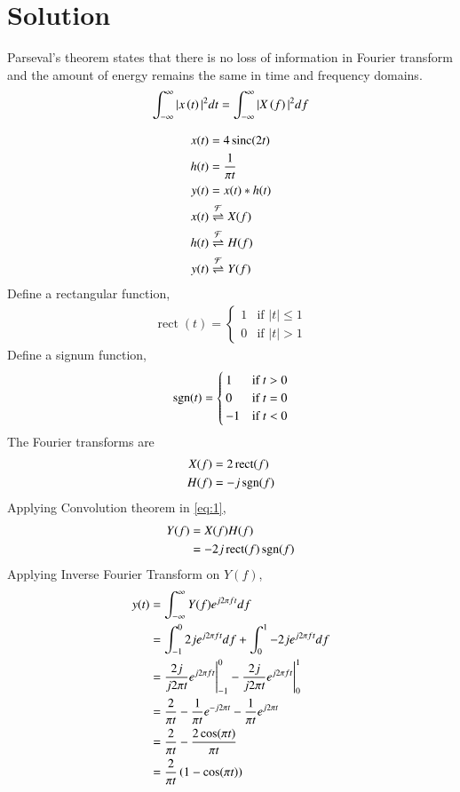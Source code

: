 \documentclass[journal,12pt,twocolumn]{IEEEtran}
\DeclareMathOperator{\sinc}{sinc}
\DeclareMathOperator{\rect}{rect}
\begin{document}
\section*{Solution}
\begin{lemma}
Parseval's theorem states that there is no loss of information in Fourier transform and the amount of energy remains the same in time and frequency domains.
\begin{align}
    \int_{-\infty}^{\infty} |x\left(t\right)|^{2} dt = \int_{-\infty}^{\infty} |X\left(f\right)|^{2} df
\end{align}
\end{lemma}
\begin{align}
    x(t) &= 4\sinc(2t)\\
    h(t) &= \frac{1}{\pi t}\\
    y(t) &= x(t) * h(t) \label{eq:1}\\
    x(t) &\fourier{X(f)}\\
    h(t) &\fourier{H(f)}\\
    y(t) &\fourier{Y(f)}
\end{align}
Define a rectangular function,
\begin{align}
    \rect(t) =
    \begin{cases}
    1 & \text{if } |t| \leq 1\\
    0 & \text{if } |t| > 1
    \end{cases}
\end{align}
Define a signum function,
\begin{align}
    \mathop{\mathrm{sgn}}(t) =
    \begin{cases}
    1 & \text{if } t > 0\\
    0 & \text{if } t = 0\\
    -1 & \text{if } t < 0
    \end{cases}
\end{align}
The Fourier transforms are
\begin{align}
    X(f) &= 2\rect(f)\\
    H(f) &= -j\sgn(f)
\end{align}
Applying Convolution theorem in \eqref{eq:1},
\begin{align}
    Y(f) &= X(f)H(f)\\
    &= -2j\rect(f)\sgn(f)
\end{align}
Applying Inverse Fourier Transform on $Y(f)$,
\begin{align}
    y(t) &= \int_{-\infty}^{\infty} Y(f)e^{j2\pi ft}df\\
    &= \int_{-1}^{0} 2je^{j2\pi ft}df + \int_{0}^{1} -2je^{j2\pi ft}df\\
    &= \frac{2j}{j2\pi t}e^{j2\pi ft}\Biggr|_{-1}^{0} - \frac{2j}{j2\pi t}e^{j2\pi ft}\Biggr|_{0}^{1}\\
    &= \frac{2}{\pi t} -\frac{1}{\pi t}e^{-j2\pi t} - \frac{1}{\pi t}e^{j2\pi t}\\
    &= \frac{2}{\pi t} - \frac{2\cos(\pi t)}{\pi t}\\
    &= \frac{2}{\pi t}\left(1 - \cos(\pi t)\right)
\end{align}
\end{document}
